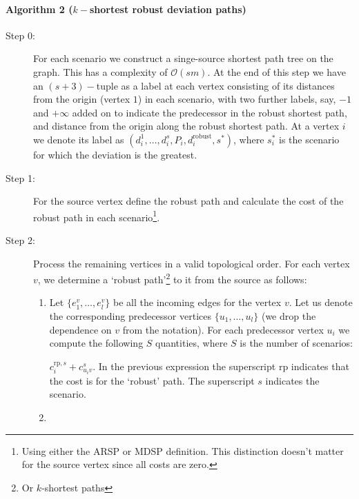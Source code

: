 \paragraph{Algorithm 2 ($k-$shortest robust deviation paths)}
\begin{description}
\item[Step 0:] For each scenario we construct a singe-source shortest path tree on the graph. This has a complexity of $\mathcal{O}(s m)$. At the end of this step we have an $(s+3)-$tuple as a label at each vertex consisting of its distances from the origin (vertex $1$) in each scenario, with two further labels, say, $-1$ and $+\infty$ added on to indicate the predecessor in the robust shortest path, and distance from the origin along the robust shortest path. At a vertex $i$ we denote its label as $(d_i^1,\dots,d_i^s,P_i,d_i^{\textrm{robust}},s^{*})$, where $s_i^{*}$ is the scenario for which the deviation is the greatest.

\item[Step 1:] For the source vertex define the robust path and calculate the cost of the robust path in each scenario\footnote{Using either the ARSP or MDSP definition. This distinction doesn't matter for the source vertex since all costs are zero.}.

\item[Step 2:] Process the remaining vertices in a valid topological order. For each vertex $v$, we determine a `robust path'\footnote{Or $k$-shortest paths} to it from the source as follows:
\begin{enumerate}
\item Let $\{e^v_1,\dots,e^v_l\}$ be all the incoming edges for the vertex $v$. Let us denote the corresponding predecessor vertices $\{u_1,\dots,u_l\}$ (we drop the dependence on $v$ from the notation). For each predecessor vertex $u_i$ we compute the following $S$ quantities, where $S$ is the number of scenarios: \begin{comment}$c^{\textrm{sp},s}_i + c^s_{u_iv}$ and\end{comment} 
$c^{\textrm{rp},s}_i + c^s_{u_iv}$. In the previous expression the superscript $\textrm{rp}$ indicates that the cost is for the `robust' path. The superscript $s$ indicates the scenario.
\item 

\end{enumerate}
\end{description}
